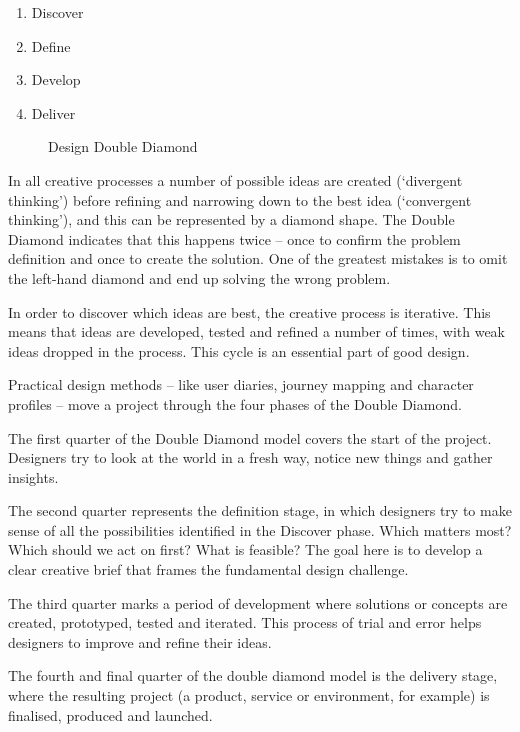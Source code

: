 \begin{enumerate}
    \item Discover
    \item Define
    \item Develop
    \item Deliver
\end{enumerate}

\begin{figure}[h!]
    \centering
    
    \caption[Design Double Diamond]{Design Double Diamond}\label{fig-dd}
\end{figure}

In all creative processes a number of possible ideas are created (`divergent thinking') before refining and narrowing down to the best idea (`convergent thinking'), and this can be represented by a diamond shape. The Double Diamond indicates that this happens twice – once to confirm the problem definition and once to create the solution. One of the greatest mistakes is to omit the left-hand diamond and end up solving the wrong problem.

In order to discover which ideas are best, the creative process is iterative. This means that ideas are developed, tested and refined a number of times, with weak ideas dropped in the process. This cycle is an essential part of good design.

Practical design methods -- like user diaries, journey mapping and character profiles -- move a project through the four phases of the Double Diamond. 

The first quarter of the Double Diamond model covers the start of the project. Designers try to look at the world in a fresh way, notice new things and gather insights.

The second quarter represents the definition stage, in which designers try to make sense of all the possibilities identified in the Discover phase. Which matters most? Which should we act on first? What is feasible? The goal here is to develop a clear creative brief that frames the fundamental design challenge.

The third quarter marks a period of development where solutions or concepts are created, prototyped, tested and iterated. This process of trial and error helps designers to improve and refine their ideas.

The fourth and final quarter of the double diamond model is the delivery stage, where the resulting project (a product, service or environment, for example) is finalised, produced and launched.

